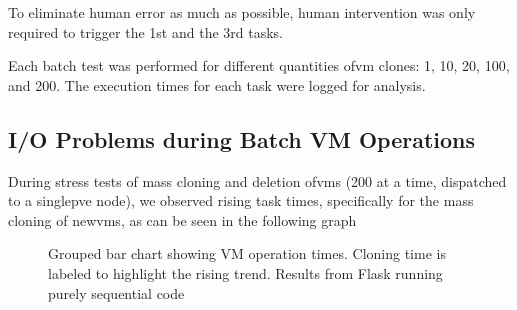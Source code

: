     To eliminate human error as much as possible, human intervention was only required to trigger the 1st and the 
    3rd tasks.

    Each batch test was performed for different quantities of\ac{vm} clones: 1, 10, 20, 100, and 200. The execution 
    times for each task were logged for analysis.

    \subsection{I/O Problems during Batch VM Operations}

        During stress tests of mass cloning and deletion of\ac{vm}s (200 at a time, dispatched to a single\ac{pve} 
        node), we observed rising task times, specifically for the mass cloning of new\ac{vm}s, as can be seen in 
        the following graph

        \begin{figure}[h]
        \centering
        \caption{Grouped bar chart showing VM operation times. Cloning time is labeled to highlight the rising trend. Results
        from Flask running purely sequential code}
        \label{fig:vm_grouped_cloning_focus}
        \end{figure}

